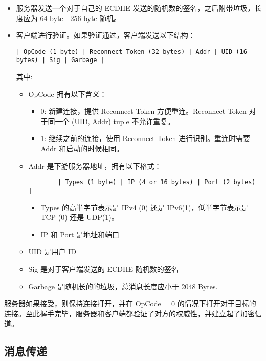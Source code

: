 \documentclass{ctexart}
\begin{document}
  \begin{itemize}
    \item 服务器发送一个对于自己的 ECDHE 发送的随机数的签名，之后附带垃圾，长度应为 64 byte - 256 byte 随机。
    \item 客户端进行验证。如果验证通过，客户端发送以下结构：

    \begin{verbatim}
| OpCode (1 byte) | Reconnect Token (32 bytes) | Addr | UID (16 bytes) | Sig | Garbage |
    \end{verbatim}

    其中:
    \begin{itemize}
      \item OpCode 拥有以下含义：
      \begin{itemize}
        \item 0: 新建连接，提供 Reconnect Token 方便重连。Reconnect Token 对于同一个 (UID, Addr) tuple 不允许重复。
        \item 1: 继续之前的连接，使用 Reconnect Token 进行识别。重连时需要 Addr 和启动的时候相同。
      \end{itemize}
      \item Addr 是下游服务器地址，拥有以下格式：
      \begin{verbatim}
        | Types (1 byte) | IP (4 or 16 bytes) | Port (2 bytes) |
      \end{verbatim}
      \begin{itemize}
        \item Types 的高半字节表示是 IPv4 (0) 还是 IPv6(1)，低半字节表示是 TCP (0) 还是 UDP(1)。
        \item IP 和 Port 是地址和端口
      \end{itemize}
      \item UID 是用户 ID
      \item Sig 是对于客户端发送的 ECDHE 随机数的签名
      \item Garbage 是随机长的的垃圾，总消息长度应小于 2048 Bytes.
    \end{itemize} 
  \end{itemize}

  服务器如果接受，则保持连接打开，并在 OpCode = 0 的情况下打开对于目标的连接。至此握手完毕，服务器和客户端都验证了对方的权威性，并建立起了加密信道。

  \subsection{消息传递}
\end{document}
